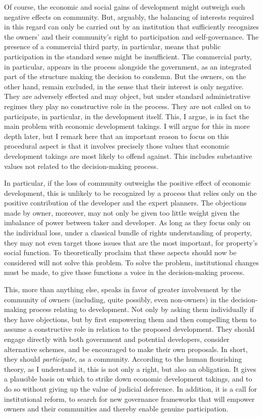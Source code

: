 Of course, the economic and social gains of development might outweigh such negative effects on community. But, arguably, the balancing of interests required in this regard can only be carried out by an institution that sufficiently recognizes the owners' and their community's right to participation and self-governance. The presence of a commercial third party, in particular, means that public participation in the standard sense might be insufficient. The commercial party, in particular, appears in the process alongside the government, as an integrated part of the structure making the decision to condemn. But the owners, on the other hand, remain excluded, in the sense that their interest is only negative. They are adversely effected and may object, but under standard administrative regimes they play no constructive role in the process. They are not called on to participate, in particular, in the development itself. This, I argue, is in fact the main problem with economic development takings. I will argue for this in more depth later, but I remark here that an important reason to focus on this procedural aspect is that it involves precisely those values that economic development takings are most likely to offend against. This includes substantive values not related to the decision-making process. 

In particular, if the loss of community outweighs the positive effect of economic development, this is unlikely to be recognized by a process that relies only on the positive contribution of the developer and the expert planners. The objections made by owner, moreover, may not only be given too little weight given the imbalance of power between taker and developer. As long as they focus only on the individual loss, under a classical bundle of rights understanding of property, they may not even target those issues that are the most important, for property's social function. To theoretically proclaim that these aspects should now be considered will not solve this problem. To solve the problem, institutional changes must be made, to give those functions a voice in the decision-making process. 

This, more than anything else, speaks in favor of greater involvement by the community of owners (including, quite possibly, even non-owners) in the decision-making process relating to development. Not only by asking them individually if they have objections, but by first empowering them and then compelling them to assume a constructive role in relation to the proposed development. They should engage directly with both government and potential developers, consider alternative schemes, and be encouraged to make their own proposals. In short, they should {\it participate}, as a community. According to the human flourishing theory, as I understand it, this is not only a right, but also an obligation. It gives a plausible basis on which to strike down economic development takings, and to do so without giving up the value of judicial deference. In addition, it is a call for institutional reform, to search for new governance frameworks that will empower owners and their communities and thereby enable genuine participation. 

